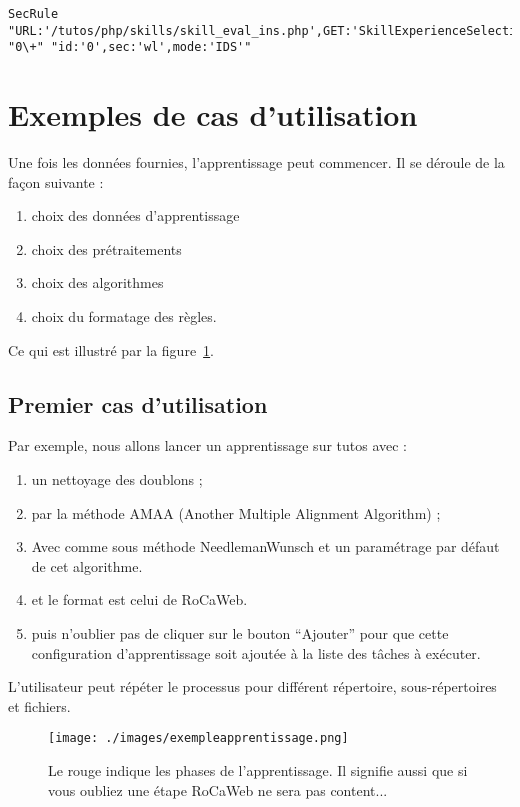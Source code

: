 \documentclass[a4paper,10pt,justified]{book}
\begin{document}
\begin{lstlisting}[basicstyle=\tiny]
SecRule "URL:'/tutos/php/skills/skill_eval_ins.php',GET:'SkillExperienceSelection_148716'" "0\+" "id:'0',sec:'wl',mode:'IDS'"  
\end{lstlisting}



\section{Exemples de cas d'utilisation}
Une fois les données fournies, l'apprentissage peut commencer.  Il se déroule de la façon suivante :
\begin{enumerate}
 \item choix des données d'apprentissage
 \item choix des prétraitements
 \item choix des algorithmes
 \item choix du formatage des règles. 
\end{enumerate}

Ce qui est illustré par la figure~\ref{exempleapprentissage}.

\subsection{Premier cas d'utilisation}
Par exemple, nous allons lancer un apprentissage sur tutos avec : 
\begin{enumerate}
 \item un nettoyage des doublons ;
 \item par la méthode AMAA (Another Multiple Alignment Algorithm) ;
 \item Avec comme sous méthode NeedlemanWunsch et un paramétrage par défaut de cet algorithme. 
 \item et le format est celui de RoCaWeb. 
 \item puis n'oublier pas de cliquer sur le bouton ``Ajouter'' pour que cette configuration d'apprentissage soit ajoutée à la liste des tâches à exécuter.
\end{enumerate}
L'utilisateur peut répéter le processus pour différent répertoire, sous-répertoires et fichiers. 


\begin{figure}
\texttt{[image: ./images/exempleapprentissage.png]}
\label{exempleapprentissage}
\caption{Le rouge indique les phases de l'apprentissage. Il signifie aussi que si vous oubliez une étape RoCaWeb ne sera pas content...}
\end{figure}
\end{document}
